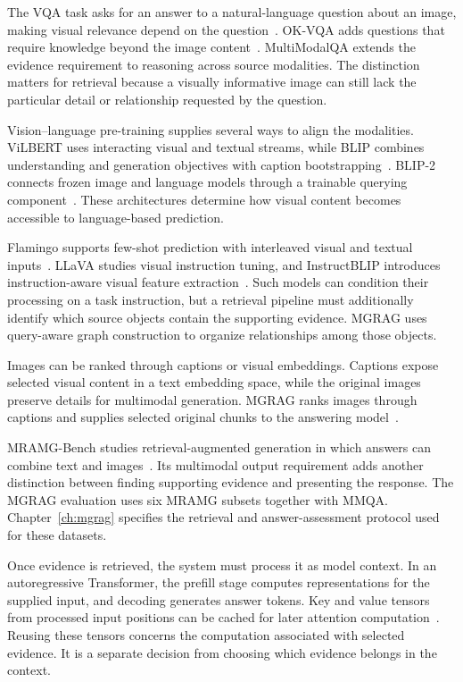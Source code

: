 The VQA task asks for an answer to a natural-language question about an image, making visual relevance depend on the question~\cite{lit-antol2015vqa}. OK-VQA adds questions that require knowledge beyond the image content~\cite{lit-marino2019okvqa}. MultiModalQA extends the evidence requirement to reasoning across source modalities. The distinction matters for retrieval because a visually informative image can still lack the particular detail or relationship requested by the question.

Vision--language pre-training supplies several ways to align the modalities. ViLBERT uses interacting visual and textual streams, while BLIP combines understanding and generation objectives with caption bootstrapping~\cite{lit-lu2019vilbert,lit-li2022blip}. BLIP-2 connects frozen image and language models through a trainable querying component~\cite{lit-li2023blip2}. These architectures determine how visual content becomes accessible to language-based prediction.

Flamingo supports few-shot prediction with interleaved visual and textual inputs~\cite{lit-alayrac2022flamingo}. LLaVA studies visual instruction tuning, and InstructBLIP introduces instruction-aware visual feature extraction~\cite{lit-liu2023llava,lit-dai2023instructblip}. Such models can condition their processing on a task instruction, but a retrieval pipeline must additionally identify which source objects contain the supporting evidence. MGRAG uses query-aware graph construction to organize relationships among those objects.

Images can be ranked through captions or visual embeddings. Captions expose selected visual content in a text embedding space, while the original images preserve details for multimodal generation. MGRAG ranks images through captions and supplies selected original chunks to the answering model~\cite{bg-mgrag}.

MRAMG-Bench studies retrieval-augmented generation in which answers can combine text and images~\cite{bg-mramg}. Its multimodal output requirement adds another distinction between finding supporting evidence and presenting the response. The MGRAG evaluation uses six MRAMG subsets together with MMQA. Chapter~\ref{ch:mgrag} specifies the retrieval and answer-assessment protocol used for these datasets.

Once evidence is retrieved, the system must process it as model context. In an autoregressive Transformer, the prefill stage computes representations for the supplied input, and decoding generates answer tokens. Key and value tensors from processed input positions can be cached for later attention computation~\cite{bg-transformer,bg-cacheblend}. Reusing these tensors concerns the computation associated with selected evidence. It is a separate decision from choosing which evidence belongs in the context.

